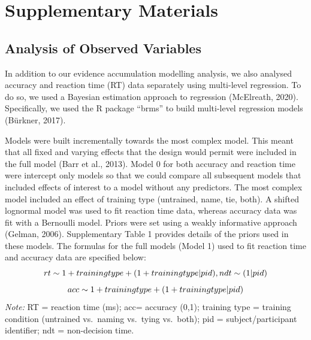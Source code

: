 \documentclass[
  man,floatsintext]{apa6}
\author{\phantom{0}}
\date{}
\affiliation{\phantom{0}}
\begin{document}
\renewcommand{\figurename}{Supplementary Figure}
\renewcommand{\tablename}{Supplemetentary Table}

\section{Supplementary Materials}\label{supplementary-materials}

\subsection{Analysis of Observed Variables}\label{analysis-of-observed-variables}

In addition to our evidence accumulation modelling analysis, we also analysed accuracy and reaction time (RT) data separately using multi-level regression. To do so, we used a Bayesian estimation approach to regression (McElreath, 2020). Specifically, we used the R package ``brms'' to build multi-level regression models (Bürkner, 2017).

Models were built incrementally towards the most complex model. This meant that all fixed and varying effects that the design would permit were included in the full model (Barr et al., 2013). Model 0 for both accuracy and reaction time were intercept only models so that we could compare all subsequent models that included effects of interest to a model without any predictors. The most complex model included an effect of training type (untrained, name, tie, both). A shifted lognormal model was used to fit reaction time data, whereas accuracy data was fit with a Bernoulli model. Priors were set using a weakly informative approach (Gelman, 2006). Supplementary Table 1 provides details of the priors used in these models. The formulas for the full models (Model 1) used to fit reaction time and accuracy data are specified below:
\[rt \sim 1 + training type + \\
(1 + training type | pid), \\
ndt \sim (1 | pid)\]
\[acc \sim 1 + training type + \\
(1 + training type | pid)\]
\emph{Note:} RT = reaction time (ms); acc= accuracy (0,1); training type = training condition (untrained vs.~naming vs.~tying vs.~both); pid = subject/participant identifier; ndt = non-decision time.
\end{document}

